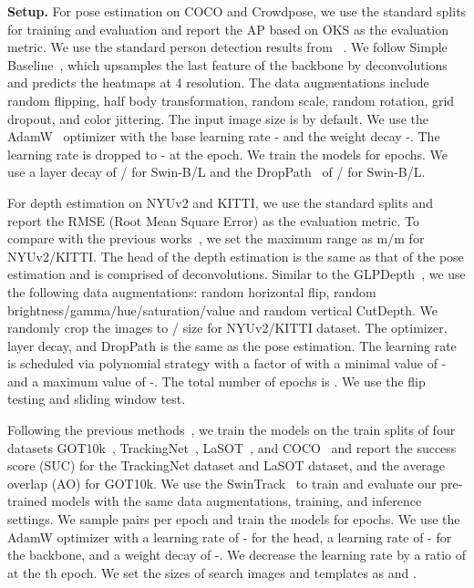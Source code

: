 \documentclass{article}
\begin{document}
\noindent\textbf{Setup.}
	For pose estimation on COCO and Crowdpose, we use the standard splits for training and evaluation and report the AP based on OKS as the evaluation metric. We use the standard person detection results from ~\cite{xiao2018sbaseline}.
    We follow Simple Baseline~\cite{xiao2018sbaseline}, which upsamples the last feature of the backbone by deconvolutions and predicts the heatmaps at 4 resolution. 
	The data augmentations include random flipping, half body transformation, random scale, random rotation, grid dropout, and color jittering. The input image size is  by default. We use the AdamW~\cite{Loshchilov2019adamw} optimizer with the base learning rate - and the weight decay -. The learning rate is dropped to - at the  epoch. We train the models for  epochs. We use a layer decay of / for Swin-B/L and the DropPath~\cite{huang2016deep} of / for Swin-B/L.



	For depth estimation on NYUv2 and KITTI, we use the standard splits and report the RMSE (Root Mean Square Error) as the evaluation metric.
	To compare with the previous works~\cite{ranftl2021dpt, kim2022glpdepth}, we set the maximum range as m/m for NYUv2/KITTI.
	The head of the depth estimation is the same as that of the pose estimation and is comprised of deconvolutions. 
     Similar to the GLPDepth~\cite{kim2022glpdepth}, we use the following data augmentations: random horizontal flip, random brightness/gamma/hue/saturation/value and random vertical CutDepth. We randomly crop the images to  /  size for NYUv2/KITTI dataset. The optimizer, layer decay, and DropPath is the same as the pose estimation. The learning rate is scheduled via polynomial strategy with a factor of  with a minimal value of - and a maximum value of -. The total number of epochs is . We use the flip testing and sliding window test.
	 
	Following the previous methods~\cite{lin2021swintrack,cui2022mixfmr}, we train the models on the train splits of four datasets GOT10k~\cite{huang2021got10k}, TrackingNet~\cite{muller2018tracknet}, LaSOT~\cite{fan2019lasot}, and COCO~\cite{lin2014microsoft} and report the success score (SUC) for the TrackingNet dataset and LaSOT dataset, and the average overlap (AO) for GOT10k. 
	We use the SwinTrack~\cite{lin2021swintrack} to train and evaluate our pre-trained models with the same data augmentations, training, and inference settings. 
	We sample  pairs per epoch and train the models for  epochs. We use the AdamW optimizer with a learning rate of - for the head, a learning rate of - for the backbone, and a weight decay of -. We decrease the learning rate by a ratio of  at the th epoch. We set the sizes of search images and templates as  and . 
\end{document}
